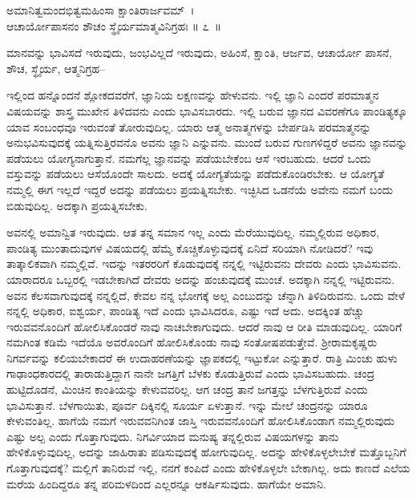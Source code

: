\begin{shloka}
ಅಮಾನಿತ್ವಮಂದಭಿತ್ವಮಹಿಂಸಾ ಕ್ಷಾಂತಿರಾರ್ಜವಮ್~।\\ಆಚಾರ್ಯೋಪಾಸನಂ ಶೌಚಂ ಸ್ಥೈರ್ಯಮಾತ್ಮವಿನಿಗ್ರಹಃ \hfill॥ ೭~॥
\end{shloka}

\begin{artha}
ಮಾನವನ್ನು ಭಾವಿಸದೆ ಇರುವುದು, ಜಂಭವಿಲ್ಲದೆ ಇರುವುದು, ಅಹಿಂಸೆ, ಕ್ಷಾಂತಿ, ಆರ್ಜವ, ಆಚಾರ್ಯೋ ಪಾಸನೆ, ಶೌಚ, ಸ್ಥೈರ್ಯ, ಆತ್ಮನಿಗ್ರಹ–
\end{artha}

ಇಲ್ಲಿಂದ ಹನ್ನೊಂದನೆ ಶ್ಲೋಕದವರೆಗೆ, ಜ್ಞಾನಿಯ ಲಕ್ಷಣವನ್ನು ಹೇಳುವನು. ಇಲ್ಲಿ ಜ್ಞಾನಿ ಎಂದರೆ ಪರಮಾತ್ಮನ ವಿಷಯವನ್ನು ಶಾಸ್ತ್ರ ಮುಖೇನ ತಿಳಿದವನು ಎಂದು ಭಾವಿಸಬಾರದು. ಇಲ್ಲಿ ಬರುವ ಜ್ಞಾನದ ವಿವರಣೆಗೂ ಪಾಂಡಿತ್ಯಕ್ಕೂ ಯಾವ ಸಂಬಂಧವೂ ಇರುವಂತೆ ತೋರುವುದಿಲ್ಲ. ಯಾರು ಆತ್ಮ ಅನಾತ್ಮಗಳನ್ನು ಬೇರ್ಪಡಿಸಿ ಪರಮಾತ್ಮನನ್ನು ಅನುಭವಿಸುವುದಕ್ಕೆ ಯತ್ನಿಸುತ್ತಿರವನೊ ಅವನು ಜ್ಞಾನಿ ಎನ್ನುವನು. ಮುಂದೆ ಬರುವ ಗುಣಗಳಿದ್ದರೆ ಅವನು ಜ್ಞಾನವನ್ನು ಪಡೆಯಲು ಯೋಗ್ಯನಾಗುತ್ತಾನೆ. ನಮಗೆಲ್ಲ ಜ್ಞಾನವನ್ನು ಪಡೆಯಬೇಕೆಂಬ ಆಸೆ ಇರಬಹುದು. ಆದರೆ ಒಂದು ವಸ್ತುವನ್ನು ಪಡೆಯಲು ಆಸೆಯೊಂದೇ ಸಾಲದು. ಅದಕ್ಕೆ ಯೋಗ್ಯತೆಯನ್ನು ಪಡೆದುಕೊಂಡಿರಬೇಕು. ಆ ಯೋಗ್ಯತೆ ನಮ್ಮಲ್ಲಿ ಈಗ ಇಲ್ಲದೆ ಇದ್ದರೆ ಅದನ್ನು ಪಡೆಯಲು ಪ್ರಯತ್ನಿಸಬೇಕು. ಇಚ್ಛಿಸಿದ ಒಡನೆಯೆ ಅವೇನು ನಮಗೆ ಬಂದು ಬಿಡುವುದಿಲ್ಲ. ಅದಕ್ಕಾಗಿ ಪ್ರಯತ್ನಿಸಬೇಕು.

ಅವನಲ್ಲಿ ಅಮಾನ್ವಿತ ಇರುವುದು. ಆತ ತನ್ನ ಸಮಾನ ಇಲ್ಲ ಎಂದು ಮೆರೆಯುವುದಿಲ್ಲ. ನಮ್ಮಲ್ಲಿರುವ ಅಧಿಕಾರ, ಪಾಂಡಿತ್ಯ ಮುಂತಾದುವುಗಳ ವಿಷಯದಲ್ಲಿ ಹೆಮ್ಮೆ ಕೊಚ್ಚಿಕೊಳ್ಳುವುದಕ್ಕೆ ಏನಿದೆ ಸರಿಯಾಗಿ ನೋಡಿದರೆ? ಇವು ತಾತ್ಕಾಲಿಕವಾಗಿ ನಮ್ಮಲ್ಲಿವೆ. ಇದನ್ನು ಇತರರರಿಗೆ ಕೊಡುವುದಕ್ಕೆ ನನ್ನಲ್ಲಿ ಇಟ್ಟಿರುವನು ದೇವರು ಎಂದು ಭಾವಿಸುವನು. ಯಾರಾದರೂ ಒಬ್ಬರಲ್ಲಿ ಇಡಬೇಕಾಗಿದೆ ದೇವರು ಅದನ್ನು ಹಂಚುವುದಕ್ಕೆ ಮುಂಚೆ. ಅದಕ್ಕಾಗಿ ನನ್ನಲ್ಲಿ ಇಟ್ಟಿರುವನು. ಅವನ ಕೆಲಸವಾಗುವುದಕ್ಕೆ ನನ್ನಲ್ಲಿದೆ, ಕೇವಲ ನನ್ನ ಭೋಗಕ್ಕೆ ಅಲ್ಲ ಎಂಬುದನ್ನು ಚೆನ್ನಾಗಿ ತಿಳಿದಿರುವನು. ಒಂದು ವೇಳೆ ನನ್ನಲ್ಲಿ ಅಧಿಕಾರ, ಐಶ್ವರ್ಯ, ಪಾಂಡಿತ್ಯ ಇದೆ ಎಂದು ಭಾವಿಸಿದರೂ, ಎಷ್ಟು ಇದೆ ಅದು. ಅದಕ್ಕಿಂತ ಹೆಚ್ಚು ಇರುವವನೊಂದಿಗೆ ಹೋಲಿಸಿಕೊಂಡರೆ ನಾವು ನಾಚಬೇಕಾಗುವುದು. ಆದರೆ ನಾವು ಆ ರೀತಿ ಮಾಡುವುದಿಲ್ಲ. ಯಾರಿಗೆ ನಮಗಿಂತ ಕಡಿಮೆ ಇದೆಯೊ ಅವರೊಂದಿಗೆ ಹೋಲಿಸಿಕೊಂಡು ನಾವು ಸಂತೋಷಪಡುತ್ತೇವೆ. ಶ‍್ರೀರಾಮಕೃಷ್ಣರು ನಿಗರ್ವವನ್ನು ಕಲಿಯಬೇಕಾದರೆ ಈ ಉದಾಹರಣೆಯನ್ನು ಜ್ಞಾಪಕದಲ್ಲಿ ಇಟ್ಟುಕೋ ಎನ್ನುತ್ತಾರೆ. ರಾತ್ರಿ ಮಿಂಚು ಹುಳು ಗಾಢಾಂಧಕಾರದಲ್ಲಿ ತಾರಾಡುತ್ತಿದ್ದಾಗ ನಾನೇ ಜಗತ್ತಿಗೆ ಬೆಳಕು ಕೊಡುತ್ತಿರುವೆ ಎಂದು ಭಾವಿಸಬಹುದು. ಚಂದ್ರ ಹುಟ್ಟಿದೊಡನೆ, ಮಿಂಚಿನ ಕಾಂತಿಯನ್ನು ಕೇಳುವವರಿಲ್ಲ. ಆಗ ಚಂದ್ರ ತಾನೆ ಜಗತ್ತನ್ನು ಬೆಳಗುತ್ತಿರುವೆ ಎಂದು ಭಾವಿಸುತ್ತಾನೆ. ಬೆಳಗಾಯಿತು, ಪೂರ್ವ ದಿಕ್ಕಿನಲ್ಲಿ ಸೂರ್ಯ ಏಳುತ್ತಾನೆ. ಇನ್ನು ಮೇಲೆ ಚಂದ್ರನನ್ನು ಯಾರೂ ಕೇಳುವಂತಿಲ್ಲ. ಹಾಗೆಯೆ ನಮಗೆ ಇರುವವನಿಗಿಂತ ಜಾಸ್ತಿ ಇರುವವನೊಂದಿಗೆ ಹೋಲಿಸಿಕೊಂಡಾಗ ನಮ್ಮಲ್ಲಿರುವುದು ಎಷ್ಟು ಅಲ್ಪ ಎಂದು ಗೊತ್ತಾಗುವುದು. ನಿಗರ್ವಿಯಾದ ಮನುಷ್ಯ ತನ್ನಲ್ಲಿರುವ ವಿಷಯಗಳನ್ನು ತಾನು ಹೇಳಿಕೊಳ್ಳುವುದಿಲ್ಲ, ಅದನ್ನು ಜಾಹಿರಾತು ಪಡಿಸುವುದಕ್ಕೆ ಹೋಗುವುದಿಲ್ಲ. ಅದನ್ನು ಹೇಳಿಕೊಳ್ಳಲೇಬೇಕೆ ಮತ್ತೊಬ್ಬನಿಗೆ ಗೊತ್ತಾಗುವುದಕ್ಕೆ? ಮಲ್ಲಿಗೆ ತಾನಿರುವೆ ಇಲ್ಲಿ, ನನಗೆ ಕಂಪಿದೆ ಎಂದು ಹೇಳಿಕೊಳ್ಳಲೇ ಬೇಕಾಗಿಲ್ಲ. ಅದು ಕಾಣದೆ ಎಲೆಯ ಮರೆಯ ಹಿಂದಿದ್ದರೂ ತನ್ನ ಪರಿಮಳದಿಂದ ಎಲ್ಲರನ್ನೂ ಆಕರ್ಷಿಸುವುದು. ಹಾಗೆಯೇ ಅಮಾನಿ.

